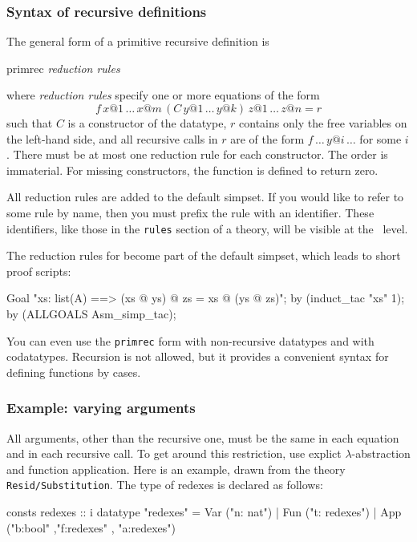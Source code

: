 \subsubsection{Syntax of recursive definitions}

The general form of a primitive recursive definition is
\begin{ttbox}
primrec
    {\it reduction rules}
\end{ttbox}
where \textit{reduction rules} specify one or more equations of the form
\[ f \, x@1 \, \dots \, x@m \, (C \, y@1 \, \dots \, y@k) \, z@1 \,
\dots \, z@n = r \] such that $C$ is a constructor of the datatype, $r$
contains only the free variables on the left-hand side, and all recursive
calls in $r$ are of the form $f \, \dots \, y@i \, \dots$ for some $i$.  
There must be at most one reduction rule for each constructor.  The order is
immaterial.  For missing constructors, the function is defined to return zero.

All reduction rules are added to the default simpset.
If you would like to refer to some rule by name, then you must prefix
the rule with an identifier.  These identifiers, like those in the
\texttt{rules} section of a theory, will be visible at the \ML\ level.

The reduction rules for {\tt\at} become part of the default simpset, which
leads to short proof scripts:
\begin{ttbox}\underscoreon
Goal "xs: list(A) ==> (xs @ ys) @ zs = xs @ (ys @ zs)";
by (induct\_tac "xs" 1);
by (ALLGOALS Asm\_simp\_tac);
\end{ttbox}

You can even use the \texttt{primrec} form with non-recursive datatypes and
with codatatypes.  Recursion is not allowed, but it provides a convenient
syntax for defining functions by cases.


\subsubsection{Example: varying arguments}

All arguments, other than the recursive one, must be the same in each equation
and in each recursive call.  To get around this restriction, use explict
$\lambda$-abstraction and function application.  Here is an example, drawn
from the theory \texttt{Resid/Substitution}.  The type of redexes is declared
as follows:
\begin{ttbox}
consts  redexes :: i
datatype
  "redexes" = Var ("n: nat")            
            | Fun ("t: redexes")
            | App ("b:bool" ,"f:redexes" , "a:redexes")
\end{ttbox}

